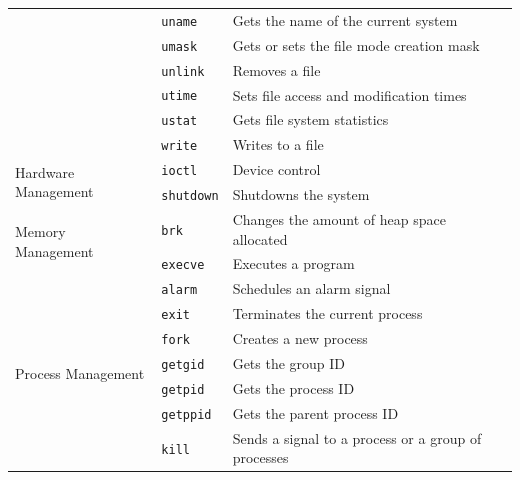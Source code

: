 \documentclass[10pt,a4paper]{article}
\begin{document}
\begin{table}[b]
\begin{tabular}{l l l}
	                                     & \texttt{uname}    & Gets the name of the current system                 \\
	                                     & \texttt{umask}    & Gets or sets the file mode creation mask            \\
	                                     & \texttt{unlink}   & Removes a file                                      \\
	                                     & \texttt{utime}    & Sets file access and modification times             \\
	                                     & \texttt{ustat}    & Gets file system statistics                         \\
	                                     & \texttt{write}    & Writes to a file                                    \\
	\midrule
	\multirow{2}{*}{Hardware Management} & \texttt{ioctl}    & Device control                                      \\
	                                     & \texttt{shutdown} & Shutdowns the system                                \\
	\midrule
	\multirow{2}{*}{Memory Management}   & \texttt{brk}      & Changes the amount of heap space allocated          \\
	                                     & \texttt{execve}   & Executes a program                                  \\
	\midrule
	\multirow{14}{*}{Process Management} & \texttt{alarm}    & Schedules an alarm signal                           \\
	                                     & \texttt{exit}     & Terminates the current process                      \\
	                                     & \texttt{fork}     & Creates a new process                               \\
	                                     & \texttt{getgid}   & Gets the group ID                                   \\
	                                     & \texttt{getpid}   & Gets the process ID                                 \\
	                                     & \texttt{getppid}  & Gets the parent process ID                          \\
	                                     & \texttt{kill}     & Sends a signal to a process or a group of processes \\

\end{tabular}
\end{table}
\end{document}
